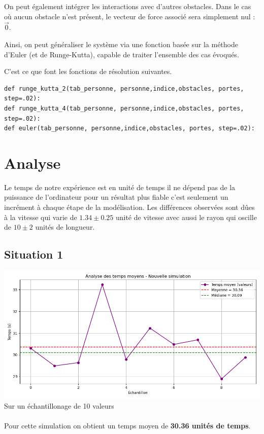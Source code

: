 \documentclass[a4paper,12pt]{article}
\begin{document}
On peut également intégrer les interactions avec d’autres obstacles. Dans le cas où aucun obstacle n’est présent, le vecteur de force associé sera simplement nul : $\vec{0}$.

\vspace{1em}

Ainsi, on peut généraliser le système via une fonction basée sur la méthode d’Euler (et de Runge-Kutta), capable de traiter l’ensemble des cas évoqués.

\vspace{1em}

C'est ce que font les fonctions de résolution suivantes.

\begin{verbatim}
def runge_kutta_2(tab_personne, personne,indice,obstacles, portes, step=.02):
def runge_kutta_4(tab_personne, personne,indice,obstacles, portes, step=.02):
def euler(tab_personne, personne,indice,obstacles, portes, step=.02):
\end{verbatim}


\section{Analyse}
Le temps de notre expérience est en unité de temps il ne dépend pas de la puissance de l'ordinateur pour un résultat plus fiable c'est seulement un incrément à chaque étape de la modélisation. Les différences observées sont dûes à la vitesse qui varie de $1.34 \pm 0.25 $ unité de vitesse avec aussi le rayon qui oscille de $10 \pm 2$ unités de longueur.
\subsection{Situation 1}

\includegraphics[width=\textwidth]{resultat.png} %
Sur un échantillonage de 10 valeurs
\\
\\
Pour cette simulation on obtient un temps moyen de \textbf{30.36 unités de temps}.
\end{document}
